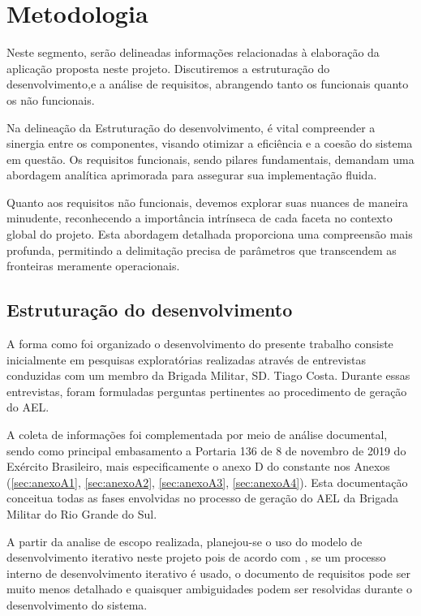 \chapter{Metodologia}
Neste segmento, serão delineadas informações relacionadas à elaboração da aplicação proposta neste projeto. Discutiremos a estruturação do desenvolvimento,e a análise de requisitos, abrangendo tanto os funcionais quanto os não funcionais.

Na delineação da Estruturação do desenvolvimento, é vital compreender a sinergia entre os componentes, visando otimizar a eficiência e a coesão do sistema em questão. Os requisitos funcionais, sendo pilares fundamentais, demandam uma abordagem analítica aprimorada para assegurar sua implementação fluida.

Quanto aos requisitos não funcionais, devemos explorar suas nuances de maneira minudente, reconhecendo a importância intrínseca de cada faceta no contexto global do projeto. Esta abordagem detalhada proporciona uma compreensão mais profunda, permitindo a delimitação precisa de parâmetros que transcendem as fronteiras meramente operacionais.

\section{Estruturação do desenvolvimento}\label{sec:estruturacao-desenvolvimento}
A forma como foi organizado o desenvolvimento do presente trabalho consiste inicialmente em pesquisas exploratórias realizadas através de entrevistas conduzidas com um membro da Brigada Militar, SD. Tiago Costa. Durante essas entrevistas, foram formuladas perguntas pertinentes ao procedimento de geração do AEL.

A coleta de informações foi complementada por meio de análise documental, sendo como principal embasamento a Portaria 136 de 8 de novembro de 2019 do Exército Brasileiro, mais especificamente o anexo D do \cite{ExércitoBrasileiro} constante nos Anexos (\ref{sec:anexoA1}, \ref{sec:anexoA2}, \ref{sec:anexoA3}, \ref{sec:anexoA4}). Esta documentação conceitua todas as fases envolvidas no processo de geração do AEL da Brigada Militar do Rio Grande do Sul.

A partir da analise de escopo realizada, planejou-se o uso do modelo de desenvolvimento iterativo neste projeto pois de acordo com \cite{engenhariasw}, se um processo interno de desenvolvimento iterativo é usado, o documento de requisitos pode ser muito menos detalhado e quaisquer ambiguidades podem ser resolvidas durante o desenvolvimento do sistema.

